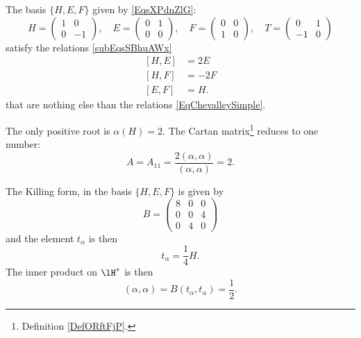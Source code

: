 \begin{example}
    The basis \( \{ H,E,F \}\) given by \eqref{EqsXPdnZlG}:
    \begin{equation} 
    H=\begin{pmatrix}
    1 & 0 \\
    0 & -1
    \end{pmatrix}
    ,\quad
      E=\begin{pmatrix}
    0 & 1 \\
    0 & 0
    \end{pmatrix}
    ,\quad
     F=\begin{pmatrix}
    0 & 0 \\
    1 & 0
    \end{pmatrix},
    \quad
    T=\begin{pmatrix}
    0&1\\
    -1&0
    \end{pmatrix}
    \end{equation}
    satisfy the relations \eqref{subEqsSBhuAWx}
    \begin{subequations}    
        \begin{align}
            [H,E]&=2E\\
            [H,F]&=-2F\\
            [E,F]&=H.
        \end{align}
    \end{subequations}
    that are nothing else than the relations \eqref{EqChevalleySimple}.

    The only positive root is \( \alpha(H)=2\). The Cartan matrix\footnote{Definition \ref{DefORftFjP}.} reduces to one number: 
    \begin{equation}
        A=A_{11}=\frac{ 2(\alpha,\alpha) }{ (\alpha,\alpha) }=2.
    \end{equation}

    The Killing form, in the basis \( \{ H,E,F \}\) is given by
    \begin{equation}
        B=\begin{pmatrix}
            8    &   0    &   0    \\
            0    &   0    &   4    \\
            0    &   4    &   0
        \end{pmatrix}
    \end{equation}
    and the element \( t_{\alpha}\) is then
    \begin{equation}
        t_{\alpha}=\frac{1}{ 4 }H.
    \end{equation}
    The inner product on \( \lH^*\) is then
    \begin{equation}        \label{Eqinnerhstarsldc}
        (\alpha,\alpha)=B(t_{\alpha},t_{\alpha})=\frac{ 1 }{2}.
    \end{equation}
\end{example}

